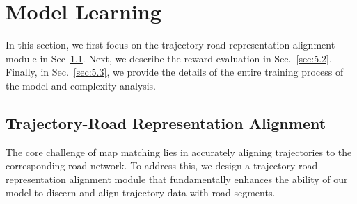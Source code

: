\section{Model Learning}
\label{sec:5}
In this section, we first focus on the trajectory-road representation alignment module in Sec~\ref{sec:5.1}. Next, we describe the reward evaluation in Sec.~\ref{sec:5.2}. Finally, in Sec.~\ref{sec:5.3}, we provide the details of the entire training process of the model and complexity analysis.
\subsection{Trajectory-Road Representation Alignment}
\label{sec:5.1}
The core challenge of map matching lies in accurately aligning trajectories to the corresponding road network. To address this, we design a trajectory-road representation alignment module that fundamentally enhances the ability of our model to discern and align trajectory data with road segments.



